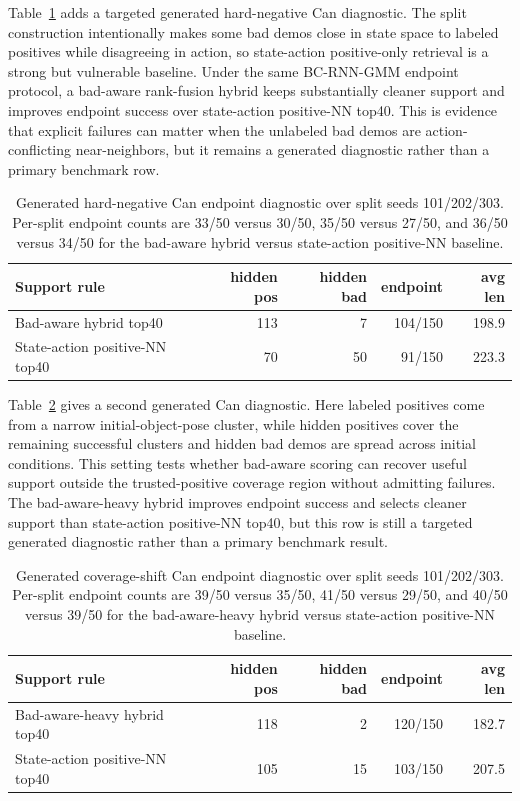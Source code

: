 \documentclass{article}
\begin{document}
Table~\ref{tab:hard-negative-can} adds a targeted generated hard-negative Can diagnostic. The split construction intentionally makes some bad demos close in state space to labeled positives while disagreeing in action, so state-action positive-only retrieval is a strong but vulnerable baseline. Under the same BC-RNN-GMM endpoint protocol, a bad-aware rank-fusion hybrid keeps substantially cleaner support and improves endpoint success over state-action positive-NN top40. This is evidence that explicit failures can matter when the unlabeled bad demos are action-conflicting near-neighbors, but it remains a generated diagnostic rather than a primary benchmark row.

\begin{table}[t]
  \centering
  \scriptsize
  \setlength{\tabcolsep}{4pt}
  \begin{tabular}{@{}lrrrr@{}}
    \toprule
    Support rule & hidden pos & hidden bad & endpoint & avg len \\
    \midrule
    Bad-aware hybrid top40 & 113 & 7 & 104/150 & 198.9 \\
    State-action positive-NN top40 & 70 & 50 & 91/150 & 223.3 \\
    \bottomrule
  \end{tabular}
  \caption{Generated hard-negative Can endpoint diagnostic over split seeds 101/202/303. Per-split endpoint counts are 33/50 versus 30/50, 35/50 versus 27/50, and 36/50 versus 34/50 for the bad-aware hybrid versus state-action positive-NN baseline.}
  \label{tab:hard-negative-can}
\end{table}

Table~\ref{tab:coverage-shift-can} gives a second generated Can diagnostic. Here labeled positives come from a narrow initial-object-pose cluster, while hidden positives cover the remaining successful clusters and hidden bad demos are spread across initial conditions. This setting tests whether bad-aware scoring can recover useful support outside the trusted-positive coverage region without admitting failures. The bad-aware-heavy hybrid improves endpoint success and selects cleaner support than state-action positive-NN top40, but this row is still a targeted generated diagnostic rather than a primary benchmark result.

\begin{table}[t]
  \centering
  \scriptsize
  \setlength{\tabcolsep}{4pt}
  \begin{tabular}{@{}lrrrr@{}}
    \toprule
    Support rule & hidden pos & hidden bad & endpoint & avg len \\
    \midrule
    Bad-aware-heavy hybrid top40 & 118 & 2 & 120/150 & 182.7 \\
    State-action positive-NN top40 & 105 & 15 & 103/150 & 207.5 \\
    \bottomrule
  \end{tabular}
  \caption{Generated coverage-shift Can endpoint diagnostic over split seeds 101/202/303. Per-split endpoint counts are 39/50 versus 35/50, 41/50 versus 29/50, and 40/50 versus 39/50 for the bad-aware-heavy hybrid versus state-action positive-NN baseline.}
  \label{tab:coverage-shift-can}
\end{table}
\end{document}
